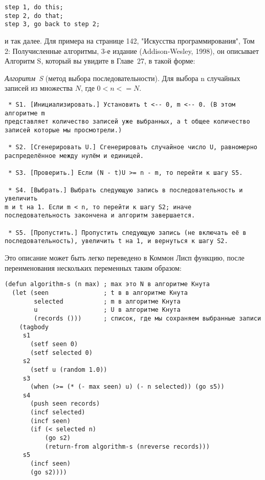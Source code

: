 \begin{verbatim}
step 1, do this; 
step 2, do that; 
step 3, go back to step 2;
\end{verbatim}

и так далее. Для примера на странице 142, "Искусства программирования", Том 2:
Получисленные алгоритмы, 3-е издание (Addison-Wesley, 1998), он описывает Алгоритм S,
который вы увидите в Главе~27, в такой форме:

\textit{Алгоритм~S} (метод выбора последовательности). Для выбора n случайных записей из
множества $N$, где $0 < n <= N$.

\begin{lstlisting}
 * S1. [Инициализировать.] Установить t <-- 0, m <-- 0. (В этом алгоритме m 
представляет количество записей уже выбранных, а t общее количество 
записей которые мы просмотрели.)

 * S2. [Сгенерировать U.] Сгенерировать случайное число U, равномерно 
распределённое между нулём и единицей.

 * S3. [Проверить.] Если (N - t)U >= n - m, то перейти к шагу S5.

 * S4. [Выбрать.] Выбрать следующую запись в последовательность и увеличить
m и t на 1. Если m < n, то перейти к шагу S2; иначе 
последовательность закончена и алгоритм завершается.

 * S5. [Пропустить.] Пропустить следующую запись (не включать её в 
последовательность), увеличить t на 1, и вернуться к шагу S2.
\end{lstlisting}

Это описание может быть легко переведено в Коммон Лисп функцию, после переименования
нескольких переменных таким образом:

\begin{lstlisting}
(defun algorithm-s (n max) ; max это N в алгоритме Кнута
  (let (seen               ; t в в алгоритме Кнута
        selected           ; m в алгоритме Кнута
        u                  ; U в алгоритме Кнута
        (records ()))      ; список, где мы сохраняем выбранные записи
    (tagbody
     s1
       (setf seen 0)
       (setf selected 0)
     s2
       (setf u (random 1.0))
     s3
       (when (>= (* (- max seen) u) (- n selected)) (go s5))
     s4
       (push seen records)
       (incf selected)
       (incf seen)
       (if (< selected n)
           (go s2)
           (return-from algorithm-s (nreverse records)))
     s5
       (incf seen)
       (go s2))))
\end{lstlisting}

